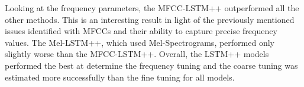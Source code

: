 Looking at the frequency parameters, the MFCC-LSTM++ outperformed all the other methods. This is an interesting result in light of the previously mentioned issues identified with MFCCs and their ability to capture precise frequency values. The Mel-LSTM++, which used Mel-Spectrograms, performed only slightly worse than the MFCC-LSTM++. Overall, the LSTM++ models performed the best at determine the frequency tuning and the coarse tuning was estimated more successfully than the fine tuning for all models.





